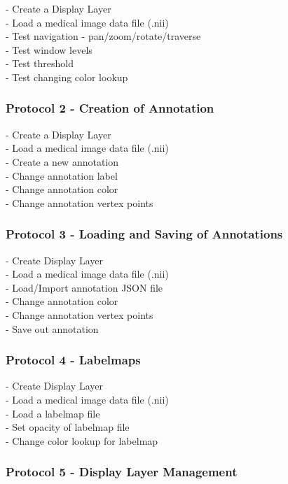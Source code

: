 \documentclass[a4paper,11pt,titlepage]{article}
\begin{document}
- Create a Display Layer\\
- Load a medical image data file (.nii)\\
- Test navigation - pan/zoom/rotate/traverse\\
- Test window levels\\
- Test threshold\\
- Test changing color lookup

\subsubsection*{Protocol 2 - Creation of Annotation }

- Create a Display Layer\\
- Load a medical image data file (.nii)\\
- Create a new annotation\\
- Change annotation label\\
- Change annotation color\\
- Change annotation vertex points

\subsubsection*{Protocol 3 - Loading and Saving of Annotations }

- Create Display Layer\\
- Load a medical image data file (.nii)\\
- Load/Import annotation JSON file\\
- Change annotation color\\
- Change annotation vertex points\\
- Save out annotation


\subsubsection*{Protocol 4 - Labelmaps }

- Create Display Layer\\
- Load a medical image data file (.nii)\\
- Load a labelmap file\\
- Set opacity of labelmap file\\
- Change color lookup for labelmap

\subsubsection*{Protocol 5 - Display Layer Management }
\end{document}
